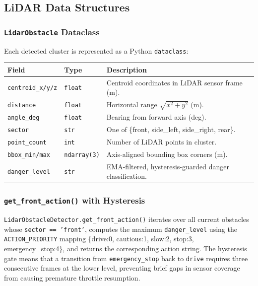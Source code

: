 \documentclass[12pt,a4paper]{article}
\begin{document}
\subsection{LiDAR Data Structures}
\label{subsec:lidar_structs}

\subsubsection{\texttt{LidarObstacle} Dataclass}

Each detected cluster is represented as a Python \texttt{dataclass}:

\begin{center}
\begin{tabular}{@{}ll p{7cm}@{}}
\toprule
\textbf{Field} & \textbf{Type} & \textbf{Description} \\
\midrule
\texttt{centroid\_x/y/z} & \texttt{float} &
  Centroid coordinates in LiDAR sensor frame (m). \\
\texttt{distance}        & \texttt{float} &
  Horizontal range $\sqrt{x^2+y^2}$ (m). \\
\texttt{angle\_deg}      & \texttt{float} &
  Bearing from forward axis (deg). \\
\texttt{sector}          & \texttt{str}   &
  One of \{front, side\_left, side\_right, rear\}. \\
\texttt{point\_count}    & \texttt{int}   &
  Number of LiDAR points in cluster. \\
\texttt{bbox\_min/max}   & \texttt{ndarray(3)} &
  Axis-aligned bounding box corners (m). \\
\texttt{danger\_level}   & \texttt{str}   &
  EMA-filtered, hysteresis-guarded danger classification. \\
\bottomrule
\end{tabular}
\end{center}

\subsubsection{\texttt{get\_front\_action()} with Hysteresis}

\texttt{LidarObstacleDetector.get\_front\_action()} iterates over all current
obstacles whose \texttt{sector == 'front'}, computes the maximum
\texttt{danger\_level} using the \texttt{ACTION\_PRIORITY} mapping
\{drive:0, cautious:1, slow:2, stop:3, emergency\_stop:4\}, and returns the
corresponding action string.  The hysteresis gate means that a transition from
\texttt{emergency\_stop} back to \texttt{drive} requires three consecutive
frames at the lower level, preventing brief gaps in sensor coverage from
causing premature throttle resumption.
\end{document}
